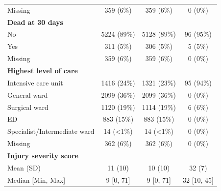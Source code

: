 \documentclass[12pt, a4paper]{article}
\begin{document}
\begin{appendices}
\begin{table}[t!]
{\begin{tabular}{lccc}
				\hspace{3mm}Missing                           & 359 (6\%)         & 359 (6\%)         & 0 (0\%)       \\
				\textbf{Dead at 30 days}                      &                   &                   &               \\
				\hspace{3mm}No                                & 5224 (89\%)       & 5128 (89\%)       & 96 (95\%)     \\
				\hspace{3mm}Yes                               & 311 (5\%)         & 306 (5\%)         & 5 (5\%)       \\
				\hspace{3mm}Missing                           & 359 (6\%)         & 359 (6\%)         & 0 (0\%)       \\
				\textbf{Highest level of care}                &                   &                   &               \\
				\hspace{3mm}Intensive care unit               & 1416 (24\%)       & 1321 (23\%)       & 95 (94\%)     \\
				\hspace{3mm}General ward                      & 2099 (36\%)       & 2099 (36\%)       & 0 (0\%)       \\
				\hspace{3mm}Surgical ward                     & 1120 (19\%)       & 1114 (19\%)       & 6 (6\%)       \\
				\hspace{3mm}ED                                & 883 (15\%)        & 883 (15\%)        & 0 (0\%)       \\
				\hspace{3mm}Specialist/Intermediate ward      & 14 (\textless1\%) & 14 (\textless1\%) & 0 (0\%)       \\
				\hspace{3mm}Missing                           & 362 (6\%)         & 362 (6\%)         & 0 (0\%)       \\
				\textbf{Injury severity score}                &                   &                   &               \\
				\hspace{3mm}Mean (SD)                         & 11 (10)           & 10 (10)           & 32 (7)        \\
				\hspace{3mm}Median [Min, Max]                 & 9 [0, 71]         & 9 [0, 71]         & 32 [10, 45]   \\

\end{tabular}}
\end{table}
\end{appendices}
\end{document}
